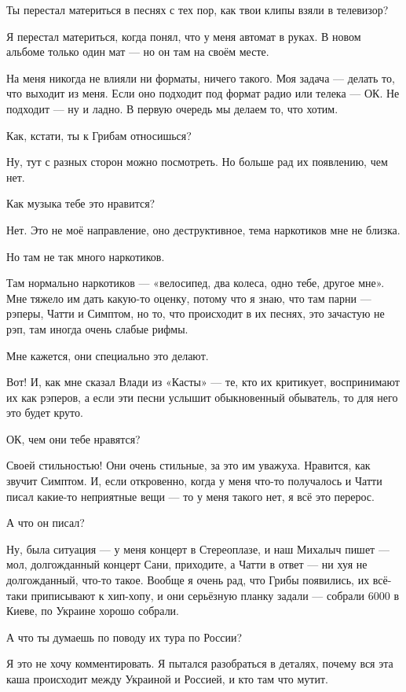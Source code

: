 Ты перестал материться в песнях с тех пор, как твои клипы взяли в телевизор?

Я перестал материться, когда понял, что у меня автомат в руках. В новом альбоме
только один мат --- но он там на своём месте.

На меня никогда не влияли ни форматы, ничего такого. Моя задача --- делать то,
что выходит из меня. Если оно подходит под формат радио или телека --- ОК. Не
подходит --- ну и ладно.  В первую очередь мы делаем то, что хотим.

Как, кстати, ты к Грибам относишься?

Ну, тут с разных сторон можно посмотреть. Но больше рад их появлению, чем нет.

Как музыка тебе это нравится?

Нет. Это не моё направление, оно деструктивное, тема наркотиков мне не близка.

Но там не так много наркотиков.

Там нормально наркотиков --- «велосипед, два колеса, одно тебе, другое мне». Мне
тяжело им дать какую-то оценку, потому что я знаю, что там парни --- рэперы,
Чатти и Симптом, но то, что происходит в их песнях, это зачастую не рэп, там
иногда очень слабые рифмы.

Мне кажется, они специально это делают.

Вот! И, как мне сказал Влади из «Касты» --- те, кто их критикует, воспринимают их
как рэперов, а если эти песни услышит обыкновенный обыватель, то для него это
будет круто.

ОК, чем они тебе нравятся?

Своей стильностью! Они очень стильные, за это им уважуха. Нравится, как звучит
Симптом. И, если откровенно, когда у меня что-то получалось и Чатти писал
какие-то неприятные вещи --- то у меня такого нет, я всё это перерос.

А что он писал?

Ну, была ситуация --- у меня концерт в Стереоплазе, и наш Михалыч пишет --- мол,
долгожданный концерт Сани, приходите, а Чатти в ответ --- ни хуя не долгожданный,
что-то такое. Вообще я очень рад, что Грибы появились, их всё-таки приписывают
к хип-хопу, и они серьёзную планку задали --- собрали 6000 в Киеве, по Украине
хорошо собрали.

А что ты думаешь по поводу их тура по России?

Я это не хочу комментировать. Я пытался разобраться в деталях, почему вся эта
каша происходит между Украиной и Россией, и кто там что мутит.

